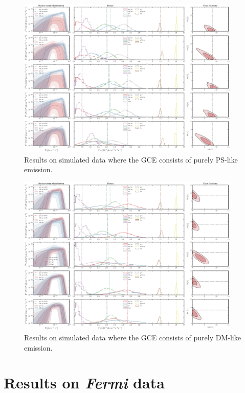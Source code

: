 \documentclass[prd,aps,10pt,nofootinbib,twocolumn,superscriptaddress,preprintnumbers,balancelastpage,longbibliography]{revtex4-1}
\begin{document}
%
\begin{figure}
    \centering
    \includegraphics[width=0.95\textwidth]{plots/sim_sbi_dm.pdf}
    \caption{Results on simulated data where the GCE consists of purely PS-like emission.}
    \label{fig:sim_sbi_dm}
\end{figure}
%

%
\begin{figure}
    \centering
    \includegraphics[width=0.95\textwidth]{plots/sim_sbi_ps.pdf}
    \caption{Results on simulated data where the GCE consists of purely DM-like emission.}
    \label{fig:sim_sbi_ps}
\end{figure}
%

\section{Results on \emph{Fermi} data}
\label{sec:data}
\end{document}
